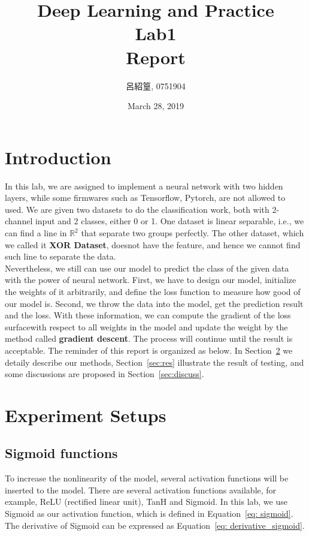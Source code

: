 \documentclass[12pt,a4paper]{article}
\title{Deep Learning and Practice \\Lab1 \\ Report}
\date{March 28, 2019}
\author{呂紹篁, 0751904}
\begin{document}
\thispagestyle{plain}
\cfoot{}
\maketitle


\section{Introduction} \label{sec:intro}
In this lab, we are assigned to implement a neural network with two hidden layers, while some firmwares such as Tensorflow, Pytorch, are not allowed to used. We are given two datasets to do the classification work, both with 2-channel input and 2 classes, either 0 or 1. One dataset is linear separable, i.e., we can find a line in ${\mathbb{R}}^2$ that separate two groups perfectly. The other dataset, which we called it \textbf{XOR Dataset}, doesnot have the feature, and hence we cannot find such line to separate the data. \\
Nevertheless, we still can use our model to predict the class of the given data with the power of neural network. First, we have to design our model, initialize the weights of it arbitrarily, and define the loss function to measure how good of our model is. Second, we throw the data into the model, get the prediction result and the loss. With these information, we can compute the gradient of the loss surfacewith respect to all weights in the model and update the weight by the method called \textbf{gradient descent}. The process will continue until the result is acceptable.
The reminder of this report is organized as below. In Section~\ref{sec:exp} we detaily describe our methods, Section~\ref{sec:res} illustrate the result of testing, and some discussions are proposed in Section~\ref{sec:discuss}.
\section{Experiment Setups} \label{sec:exp}
\subsection{Sigmoid functions}
To increase the nonlinearity of the model, several activation functions will be inserted to the model.  There are several activation functions available, for example, ReLU (rectified linear unit), TanH and Sigmoid. In this lab, we use Sigmoid as our activation function, which is defined in Equation~\ref{eq: sigmoid}. The derivative of Sigmoid can be expressed as Equation~\ref{eq: derivative_sigmoid}.
\end{document}
